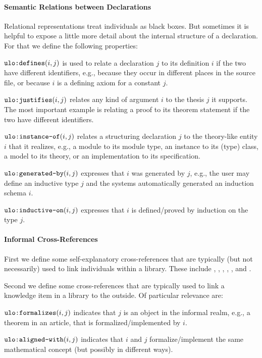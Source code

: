 \paragraph{Semantic Relations between Declarations}
Relational representations treat individuals as black boxes.
But sometimes it is helpful to expose a little more detail about the internal structure of a declaration.
For that we define the following properties:
\begin{compactitem}
 \item $\ind{defines}(i,j)$ is used to relate a declaration $j$ to its definition $i$ if the two have different identifiers, e.g., because they occur in different places in the source file, or because $i$ is a defining axiom for a constant $j$.
 \item $\ind{justifies}(i,j)${\isabelle} relates any kind of argument $i$ to the thesis $j$ it supports. The most important example is relating a proof to its theorem statement if the two have different identifiers.
 \item $\ind{instance-of}(i,j)${\isabelle\coq} relates a structuring declaration $j$ to the theory-like entity $i$ that it realizes, e.g., a module to its module type, an instance to its (type) class, a model to its theory, or an implementation to its specification.
 \item $\ind{generated-by}(i,j)$ expresses that $i$ was generated by $j$, e.g., the user may define an inductive type $j$ and the systems automatically generated an induction schema $i$.
 \item $\ind{inductive-on}(i,j)${\isabelle} expresses that $i$ is defined/proved by induction on the type $j$.
\end{compactitem}

\paragraph{Informal Cross-References}
First we define some self-explanatory cross-references that are typically (but not necessarily) used to link individuals within a library. These include , , , , , and .

Second we define some cross-references that are typically used to link a knowledge item in a library to the outside.
Of particular relevance are:
\begin{compactitem}
 \item $\ind{formalizes}(i,j)$ indicates that $j$ is an object in the informal realm, e.g., a theorem in an article, that is formalized/implemented by $i$.
 \item $\ind{aligned-with}(i,j)$ indicates that $i$ and $j$ formalize/implement the same mathematical concept (but possibly in different ways).
\end{compactitem}

